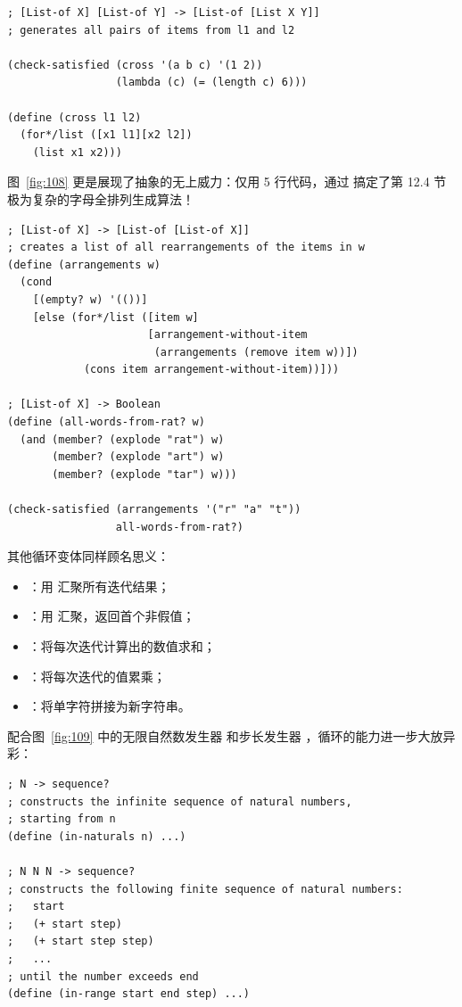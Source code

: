 \begin{lstlisting}[language=BSL]
; [List-of X] [List-of Y] -> [List-of [List X Y]]
; generates all pairs of items from l1 and l2

(check-satisfied (cross '(a b c) '(1 2))
                 (lambda (c) (= (length c) 6)))

(define (cross l1 l2)
  (for*/list ([x1 l1][x2 l2])
    (list x1 x2)))
\end{lstlisting}

图~\ref{fig:108} 更是展现了抽象的无上威力：仅用 5 行代码，通过  搞定了第 12.4 节极为复杂的字母全排列生成算法！

\begin{lstlisting}[language=BSL, basicstyle=\scriptsize\ttfamily]
; [List-of X] -> [List-of [List-of X]]
; creates a list of all rearrangements of the items in w
(define (arrangements w)
  (cond
    [(empty? w) '(())]
    [else (for*/list ([item w]
                      [arrangement-without-item
                       (arrangements (remove item w))])
            (cons item arrangement-without-item))]))

; [List-of X] -> Boolean
(define (all-words-from-rat? w)
  (and (member? (explode "rat") w)
       (member? (explode "art") w)
       (member? (explode "tar") w)))

(check-satisfied (arrangements '("r" "a" "t"))
                 all-words-from-rat?)
\end{lstlisting}
\label{fig:108}

其他循环变体同样顾名思义：
\begin{itemize}
  \item {}：用  汇聚所有迭代结果；
  \item {}：用  汇聚，返回首个非假值；
  \item {}：将每次迭代计算出的数值求和；
  \item {}：将每次迭代的值累乘；
  \item {}：将单字符拼接为新字符串。
\end{itemize}

配合图~\ref{fig:109} 中的无限自然数发生器  和步长发生器 ，循环的能力进一步大放异彩：

\begin{lstlisting}[language=BSL, basicstyle=\scriptsize\ttfamily]
; N -> sequence?
; constructs the infinite sequence of natural numbers,
; starting from n
(define (in-naturals n) ...)

; N N N -> sequence?
; constructs the following finite sequence of natural numbers:
;   start
;   (+ start step)
;   (+ start step step)
;   ...
; until the number exceeds end
(define (in-range start end step) ...)
\end{lstlisting}
\label{fig:109}

